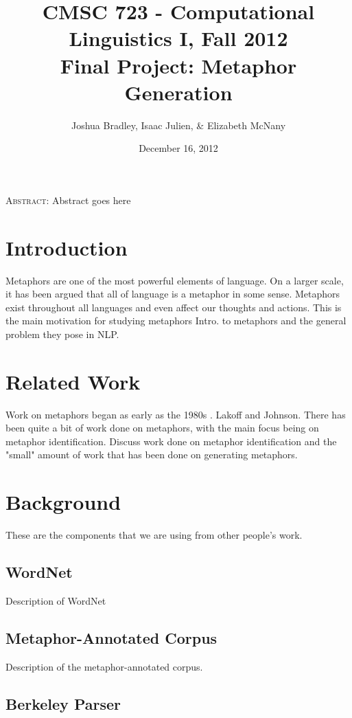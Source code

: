\documentclass[12pt]{article}
\title{CMSC 723 - Computational Linguistics I, Fall 2012\\
Final Project: Metaphor Generation}
\author{Joshua Bradley, Isaac Julien, \& Elizabeth McNany}
\date{December 16, 2012}
\begin{document}
  \maketitle

\begin{center}
\small
\textsc{Abstract}: Abstract goes here
\end{center}

\section{Introduction}

Metaphors are one of the most powerful elements of language. On a larger scale, it has been argued that all of language is a metaphor in some sense. Metaphors exist throughout all languages and even affect our thoughts and actions. This is the main motivation for studying metaphors Intro. to metaphors and the general problem they pose in NLP.

\section{Related Work}

Work on metaphors began as early as the 1980s \cite{lakoff80}. Lakoff and Johnson. There has been quite a bit of work done on metaphors, with the main focus being on metaphor identification. Discuss work done on metaphor identification and the "small" amount of work that has been done on generating metaphors.

\section{Background}
These are the components that we are using from other people's work.

\subsection{WordNet}

Description of WordNet

\subsection{Metaphor-Annotated Corpus}

Description of the metaphor-annotated corpus.

\subsection{Berkeley Parser}
\label{sec:berkeleyparser}
\end{document}
